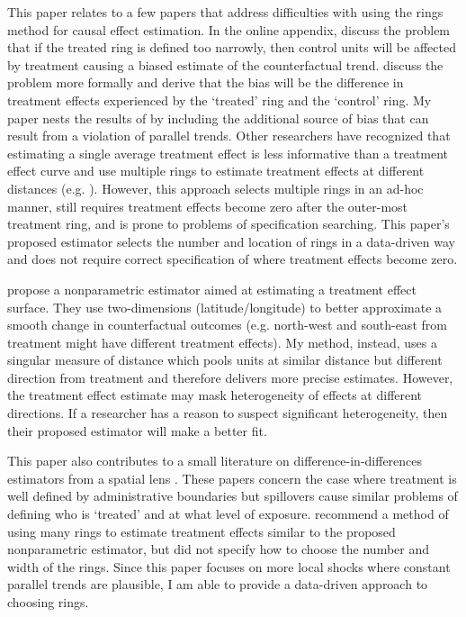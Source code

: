 \documentclass[10pt]{article}
\begin{document}
This paper relates to a few papers that address difficulties with using the rings method for causal effect estimation. In the online appendix, \citet{Gerardi_Rosenblatt_Willen_Yao_2015} discuss the problem that if the treated ring is defined too narrowly, then control units will be affected by treatment causing a biased estimate of the counterfactual trend. \citet{Sullivan_2017} discuss the problem more formally and derive that the bias will be the difference in treatment effects experienced by the `treated' ring and the `control' ring. My paper nests the results of \citet{Sullivan_2017} by including the additional source of bias that can result from a violation of parallel trends. Other researchers have recognized that estimating a single average treatment effect is less informative than a treatment effect curve and use multiple rings to estimate treatment effects at different distances (e.g. \citet{Alexander_Currie_Schnell_2019}). However, this approach selects multiple rings in an ad-hoc manner, still requires treatment effects become zero after the outer-most treatment ring, and is prone to problems of specification searching. This paper's proposed estimator selects the number and location of rings in a data-driven way and does not require correct specification of where treatment effects become zero.

\citet{Diamond_McQuade_2019} propose a nonparametric estimator aimed at estimating a treatment effect surface. They use two-dimensions (latitude/longitude) to better approximate a smooth change in counterfactual outcomes (e.g. north-west and south-east from treatment might have different treatment effects). My method, instead, uses a singular measure of distance which pools units at similar distance but different direction from treatment and therefore delivers more precise estimates. However, the treatment effect estimate may mask heterogeneity of effects at different directions. If a researcher has a reason to suspect significant heterogeneity, then their proposed estimator will make a better fit.

This paper also contributes to a small literature on difference-in-differences estimators from a spatial lens \citep{Butts_2021,Clarke_2017,Berg_Streitz_2019,Verbitsky-Savitz_Raudenbush_2012,Delgado_Florax_2015}. These papers concern the case where treatment is well defined by administrative boundaries but spillovers cause similar problems of defining who is `treated' and at what level of exposure. \citet{Butts_2021,Clarke_2017} recommend a method of using many rings to estimate treatment effects similar to the proposed nonparametric estimator, but did not specify how to choose the number and width of the rings. Since this paper focuses on more local shocks where constant parallel trends are plausible, I am able to provide a data-driven approach to choosing rings.
\end{document}
